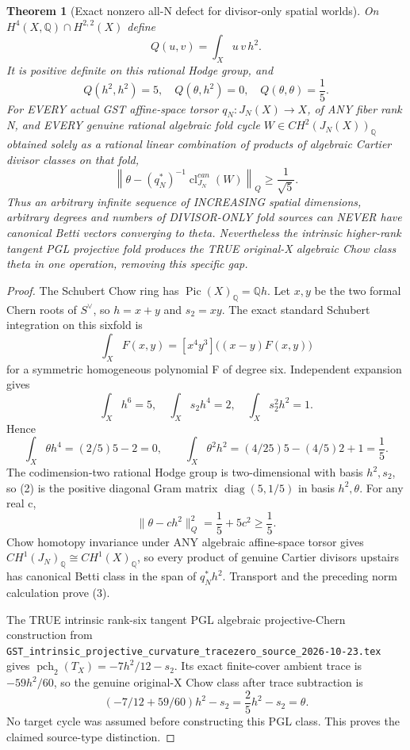 \documentclass[11pt]{article}
\newtheorem{theorem}{Theorem}
\begin{document}
\begin{theorem}[Exact nonzero all-N defect for divisor-only spatial worlds]
On $H^4(X,\mathbb Q)\cap H^{2,2}(X)$ define
\[
  Q(u,v)=\int_Xu\,v\,h^2.
\]
It is positive definite on this rational Hodge group, and
\[
 \boxed{
 Q(h^2,h^2)=5,\quad
 Q(\theta,h^2)=0,\quad Q(\theta,\theta)=\frac15.
 }                                                   \tag{2}
\]
For EVERY actual GST affine-space torsor
$q_N:J_N(X)\to X$, of ANY fiber rank N, and EVERY
genuine rational algebraic fold cycle
$W\in CH^2(J_N(X))_\mathbb Q$ obtained solely
as a rational linear combination of products of
algebraic Cartier divisor classes on that fold,
\[
 \boxed{
 \left\|\theta-(q_N^*)^{-1}
   \operatorname{cl}_{J_N}^{can}(W)\right\|_Q
        \ge\frac1{\sqrt5}.
 }                                                   \tag{3}
\]
Thus an arbitrary infinite sequence of INCREASING
spatial dimensions, arbitrary degrees and numbers
of DIVISOR-ONLY fold sources can NEVER have canonical
Betti vectors converging to theta. Nevertheless the
intrinsic higher-rank tangent PGL projective fold
produces the TRUE original-X algebraic Chow class
theta in one operation, removing this specific gap.
\end{theorem}
\begin{proof}
The Schubert Chow ring has
$\operatorname{Pic}(X)_\mathbb Q=\mathbb Q h$.
Let $x,y$ be the two formal Chern roots of
$S^\vee$, so $h=x+y$ and $s_2=xy$.
The exact standard Schubert integration on
this sixfold is
\[
 \int_XF(x,y)=[x^4y^3]\big((x-y)F(x,y)\big)
\]
for a symmetric homogeneous polynomial F of degree six.
Independent expansion gives
\[
 \int_Xh^6=5,\quad
 \int_Xs_2h^4=2,\quad
 \int_Xs_2^2h^2=1.
\]
Hence
\[
 \int_X\theta h^4=(2/5)5-2=0,
 \qquad
 \int_X\theta^2h^2=(4/25)5-(4/5)2+1=\frac15 .
\]
The codimension-two rational Hodge group is
two-dimensional with basis $h^2,s_2$,
so (2) is the positive diagonal Gram matrix
$\operatorname{diag}(5,1/5)$ in basis
$h^2,\theta$. For any real c,
\[
 \|\theta-c h^2\|_Q^2=\frac15+5c^2\ge\frac15.
\]
Chow homotopy invariance under ANY algebraic affine-space
torsor gives $CH^1(J_N)_\mathbb Q\cong CH^1(X)_\mathbb Q$,
so every product of genuine Cartier divisors upstairs
has canonical Betti class in the span of $q_N^*h^2$.
Transport and the preceding norm calculation prove (3).

The TRUE intrinsic rank-six tangent PGL algebraic
projective-Chern construction from
\texttt{GST\_intrinsic\_projective\_curvature\_tracezero\_source\_2026-10-23.tex}
gives
$\operatorname{pch}_2(T_X)=-7h^2/12-s_2$.
Its exact finite-cover ambient trace is $-59h^2/60$,
so the genuine original-X Chow class after trace subtraction is
\[
 (-7/12+59/60)h^2-s_2=\frac25h^2-s_2=\theta .
\]
No target cycle was assumed before constructing this PGL
class. This proves the claimed source-type distinction.
\end{proof}
\end{document}
